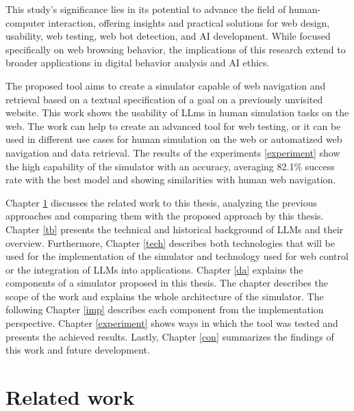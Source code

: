 This study's significance lies in its potential to advance the field of human-computer interaction, offering insights and practical solutions for web design, usability, web testing, web bot detection, and AI development. While focused specifically on web browsing behavior, the implications of this research extend to broader applications in digital behavior analysis and AI ethics.

The proposed tool aims to create a simulator capable of web navigation and retrieval based on a textual specification of a goal on a previously unvisited website. This work shows the usability of LLms in human simulation tasks on the web. The work can help to create an advanced tool for web testing, or it can be used in different use cases for human simulation on the web or automatized web navigation and data retrieval. The results of the experiments \ref{experiment} show the high capability of the simulator with an accuracy, averaging 82.1\% success rate with the best model and showing similarities with human web navigation.

Chapter \ref{rw} discusses the related work to this thesis, analyzing the previous approaches and comparing them with the proposed approach by this thesis. Chapter \ref{tb} presents the technical and historical background of LLMs and their overview. Furthermore, Chapter \ref{tech} describes both technologies that will be used for the implementation of the simulator and technology used for web control or the integration of LLMs into applications. Chapter \ref{da} explains the components of a simulator proposed in this thesis. The chapter describes the scope of the work and explains the whole architecture of the simulator. The following Chapter \ref{imp} describes each component from the implementation perspective. Chapter \ref{experiment} shows ways in which the tool was tested and presents the achieved results. Lastly, Chapter \ref{con} summarizes the findings of this work and future development.    



\chapter{Related work}
\label{rw}

